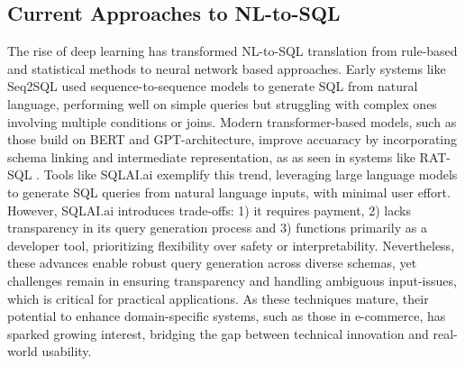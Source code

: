 \documentclass[../../submission.tex]{subfiles}
\begin{document}
\subsection{Current Approaches to NL-to-SQL}
The rise of deep learning has transformed NL-to-SQL translation from 
rule-based and statistical methods to neural network based approaches. Early systems
like Seq2SQL \cite{zhongSeq2SQLGeneratingStructured2017} used sequence-to-sequence models to generate SQL from natural language,
performing well on simple queries but struggling with complex ones involving multiple 
conditions or joins. Modern transformer-based models, such as those build on BERT and GPT-architecture,
improve accuaracy by incorporating schema linking and intermediate representation, as 
as seen in systems like RAT-SQL \cite{wangRATSQLRelationAwareSchema2021}. Tools like SQLAI.ai \cite{GenerateSQLQueries} exemplify this trend, leveraging large language models
to generate SQL queries from natural language inputs, with minimal user effort. However, SQLAI.ai 
introduces trade-offs: 1{)} it requires payment, 2{)} lacks transparency in its query generation process and 3{)}
functions primarily as a developer tool, prioritizing flexibility over safety or interpretability.
Nevertheless, these advances enable robust query generation across diverse 
schemas, yet challenges remain in ensuring transparency and handling ambiguous input-issues, which 
is critical for practical applications. As these techniques mature, their 
potential to enhance domain-specific systems, such as those in e-commerce, has sparked growing interest, bridging
the gap between technical innovation and real-world usability.
\end{document}
